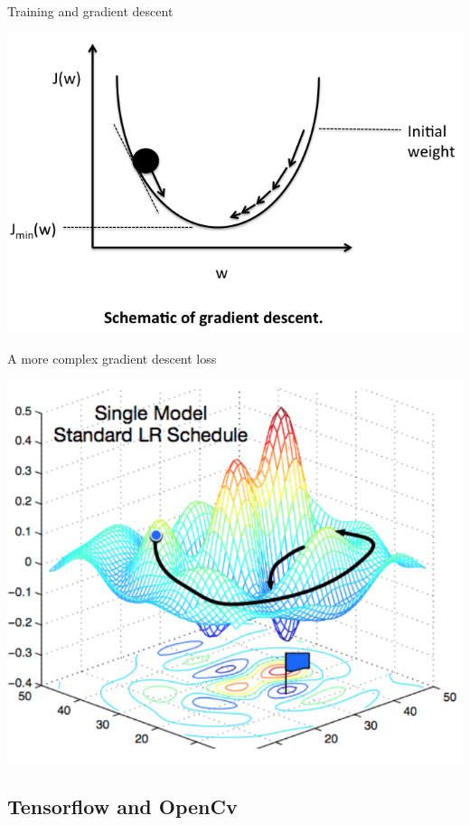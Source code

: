 \documentclass{beamer}
\begin{document}
\begin{frame}{Training and gradient descent}
	\begin{center}
    		\includegraphics[scale=0.4]{grad}
	\end{center}
\end{frame}

\begin{frame}{A more complex gradient descent loss}
	\begin{center}
    		\includegraphics[scale=0.3]{suchcomp}
	\end{center}
\end{frame}

\subsection{Tensorflow and OpenCv}
\end{document}
